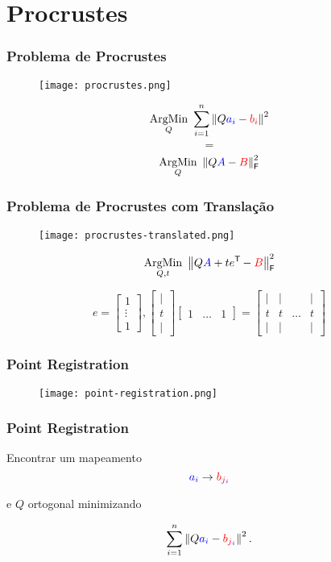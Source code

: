 
\section{Procrustes}

\begin{frame}[fragile]
  \frametitle{Problema de Procrustes}
  \begin{figure}
    \centering
    \texttt{[image: procrustes.png]}
  \end{figure}

  \[\underset{Q}{\text{ArgMin}}\,\, \sum_{i=1}^{n} \left\lVert Q\textcolor{blue}{a_i} - \textcolor{red}{b_i}\right\rVert^2\]
  \[=\]
  \[\underset{Q}{\text{ArgMin}}\,\, \left\lVert Q\textcolor{blue}{A} - \textcolor{red}{B}\right\rVert_\mathsf{F}^2\]
\end{frame}

\begin{frame}[fragile]
  \frametitle{Problema de Procrustes com Translação}
  \begin{figure}
    \centering
    \texttt{[image: procrustes-translated.png]}
  \end{figure}

  \[\underset{Q,t}{\text{ArgMin}}\,\, \left\lVert Q\textcolor{blue}{A} + t e^{\mathsf{T}\mkern-1mu} - \textcolor{red}{B}\right\rVert_\mathsf{F}^2\]

  \[e = \begin{bmatrix} 1 \\ \vdots \\ 1 \end{bmatrix}, \begin{bmatrix} \vert \\ t \\ \vert \end{bmatrix}\begin{bmatrix} 1 & \dots & 1 \end{bmatrix} = \begin{bmatrix} \vert & \vert & & \vert \\ t & t & \dots & t \\ \vert & \vert & & \vert \end{bmatrix}\]
\end{frame}

\begin{frame}
  \frametitle{Point Registration}
  \begin{figure}
    \centering
    \texttt{[image: point-registration.png]}
  \end{figure}
\end{frame}

\begin{frame}
  \frametitle{Point Registration}
  \begin{center}
    Encontrar um mapeamento \[\textcolor{blue}{a_i} \to \textcolor{red}{b}_{\textcolor{red}{j}_{\textcolor{blue}{i}}}\]

    e $Q$ ortogonal minimizando

    \[\sum_{i=1}^{n} \left\lVert Q\textcolor{blue}{a_{i}} - \textcolor{red}{b}_{\textcolor{red}{j}_{\textcolor{blue}{i}}}\right\rVert^2.\]
  \end{center}
\end{frame}
